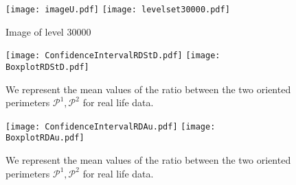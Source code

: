\documentclass[12pt]{article}
\theoremstyle{Theorem}
\begin{document}
\begin{figure}[H]
  \centering
    {\texttt{[image: imageU.pdf]}}
    \hspace{3cm}
    {\texttt{[image: levelset30000.pdf]}}
    \hspace{0.2cm}
 \caption{ Image of level $30000$}
\label{fig2}
\end{figure}

\begin{figure}[H]
  \centering
    {\texttt{[image: ConfidenceIntervalRDStD.pdf]}}
    {\texttt{[image: BoxplotRDStD.pdf]}}
    \hspace{0.2cm}
 \caption{We represent the mean values of the ratio between the two oriented perimeters $\mathcal{P}^{1}, \mathcal{P}^{2}$ for real life data.}
\label{fig2}
\end{figure}


\begin{figure}[H]
  \centering
    {\texttt{[image: ConfidenceIntervalRDAu.pdf]}}
    {\texttt{[image: BoxplotRDAu.pdf]}}
    \hspace{0.2cm}
 \caption{We represent the mean values of the ratio between the two oriented perimeters $\mathcal{P}^{1}, \mathcal{P}^{2}$ for real life data.}
\label{fig2}
\end{figure}
\appendix 
\end{document}
